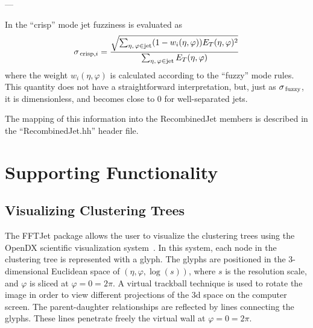 \documentclass[epsf,12pt,titlepage]{article}
\newcommand{\sub}[1]{\ensuremath{_{\mbox{\scriptsize \,#1}}}}
\newcommand{\cname}[1]{\index{#1}\textsf{#1}}
\newenvironment{thinlist} {
    \begin{list} {---} {
        \setlength{\topsep}{0.075cm}
        \setlength{\parsep}{0.075cm}
        \setlength{\itemsep}{0.075cm}
    }
} {\end{list}}
\begin{document}
\begin{thinlist}
      In the ``crisp'' mode jet fuzziness is evaluated as
      $$
      \sigma\sub{crisp,$i$} = \frac{\sqrt{\sum_{\eta, \, \varphi \in \mbox{\scriptsize{jet}}} (1 - w_i(\eta, \varphi)) E_{T}(\eta, \varphi)^2}}{\sum_{\eta, \, \varphi \in \mbox{\scriptsize{jet}}} E_{T}(\eta, \varphi)}
      $$
      where the weight $w_i(\eta, \varphi)$ is calculated according
      to the ``fuzzy'' mode rules. This quantity does not have a straightforward
      interpretation, but, just as $\sigma\sub{fuzzy}$,
      it is dimensionless, and becomes close to 0 for well-separated jets.
\end{thinlist}

\noindent The mapping of this information into the \cname{RecombinedJet}
members is described in the ``RecombinedJet.hh'' header file.


\section{Supporting Functionality}
\subsection{Visualizing Clustering Trees}

The FFTJet package allows the user to visualize the clustering trees
using the OpenDX scientific visualization system~\cite{ref:opendx}.
In this system,
each node in the clustering tree is represented with a glyph. The
glyphs are positioned in the 3-dimensional Euclidean
space of $(\eta, \varphi, \log(s))$, where $s$ is the resolution
scale, and $\varphi$ is sliced at $\varphi = 0 = 2 \pi$. A virtual trackball
technique is used to rotate the image in order to view different
projections of the 3d space on the computer screen. The parent-daughter
relationships are reflected by lines connecting the glyphs. These lines
penetrate freely the virtual wall at $\varphi = 0 = 2 \pi$.
\end{document}
